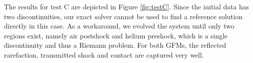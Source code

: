 \documentclass[final,3p,twocolumn]{elsarticle}
\begin{document}
The results for test C are depicted in Figure \ref{fig:testC}. Since the
initial data has two discontinuities, our exact solver cannot be used to find
a reference solution directly in this case. As a workaround, we evolved the
system until only two regions exist, namely air postshock and helium preshock,
which is a single discontinuity and thus a Riemann problem. For both GFMs, the
reflected rarefaction, transmitted shock and contact are captured very well. 

\end{document}
